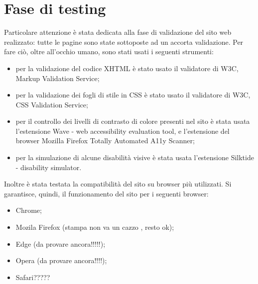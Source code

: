 \section{Fase di testing}
Particolare attenzione è stata dedicata alla fase di validazione del sito web realizzato: tutte le pagine sono state sottoposte ad un accorta validazione. Per fare ciò, oltre all'occhio umano, sono stati usati i seguenti strumenti: 
\begin{itemize}
	\item per la validazione del codice XHTML è stato usato il validatore di W3C, Markup Validation Service;
	\item per la validazione dei fogli di stile in CSS è stato usato il validatore di W3C, CSS Validation Service;
	\item per il controllo dei livelli di contrasto di colore presenti nel sito è stata usata l'estensione Wave - web accessibility evaluation tool, e l'estensione del browser Mozilla Firefox Totally Automated A11y Scanner;
	\item per la simulazione di alcune disabilità visive è stata usata l'estensione Silktide - disability simulator.
\end{itemize}
Inoltre è stata testata la compatibilità del sito su browser più utilizzati. Si garantisce, quindi, il funzionamento del sito per i seguenti browser:
\begin{itemize}
\item Chrome;
\item Mozila Firefox (stampa non va un cazzo , resto ok);
\item Edge (da provare ancora!!!!!);
\item Opera (da provare ancora!!!!);
\item Safari?????
\end{itemize}